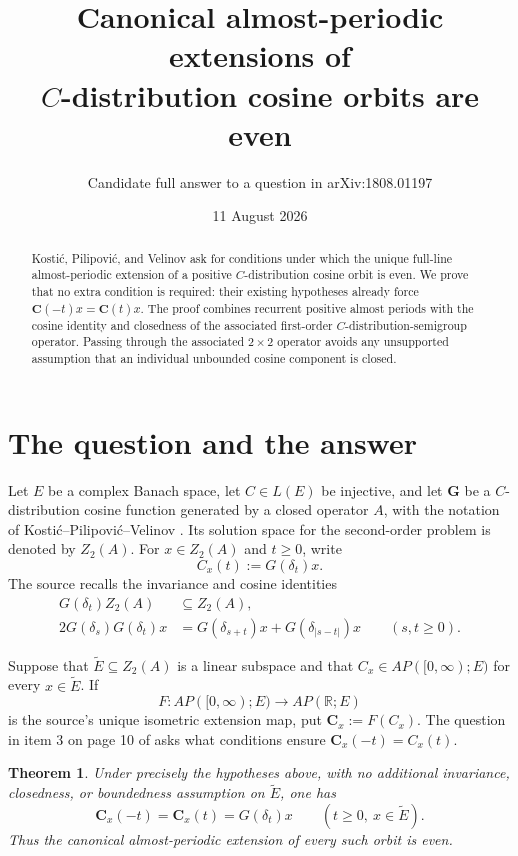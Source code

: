 \documentclass[11pt]{article}
\title{Canonical almost-periodic extensions of\\
$C$-distribution cosine orbits are even}
\author{Candidate full answer to a question in arXiv:1808.01197}
\date{11 August 2026}
\newcommand{\R}{\mathbb R}
\newcommand{\Eap}{\widetilde E}
\newcommand{\Gop}{G}
\newcommand{\Cb}{\mathbf C}
\newtheorem{theorem}{Theorem}
\begin{document}
\maketitle

\begin{abstract}
Kosti\'c, Pilipovi\'c, and Velinov ask for conditions under which the unique
full-line almost-periodic extension of a positive $C$-distribution cosine
orbit is even.  We prove that no extra condition is required: their existing
hypotheses already force $\Cb(-t)x=\Cb(t)x$.  The proof combines recurrent
positive almost periods with the cosine identity and closedness of the
associated first-order $C$-distribution-semigroup operator.  Passing through
the associated $2\times2$ operator avoids any unsupported assumption that an
individual unbounded cosine component is closed.
\end{abstract}

\section{The question and the answer}

Let $E$ be a complex Banach space, let $C\in L(E)$ be injective, and let
$\mathbf G$ be a $C$-distribution cosine function generated by a closed
operator $A$, with the notation of Kosti\'c--Pilipovi\'c--Velinov
\cite{KPV}.  Its solution space for the second-order problem is denoted by
$Z_2(A)$.  For $x\in Z_2(A)$ and $t\geq0$, write
\[
  C_x(t):=\Gop(\delta_t)x.
\]
The source recalls the invariance and cosine identities
\begin{align}
 \Gop(\delta_t)Z_2(A)&\subseteq Z_2(A), \label{eq:invariance}\\
 2\Gop(\delta_s)\Gop(\delta_t)x
   &=\Gop(\delta_{s+t})x+\Gop(\delta_{|s-t|})x
       \qquad(s,t\geq0). \label{eq:cosine}
\end{align}

Suppose that $\Eap\subseteq Z_2(A)$ is a linear subspace and that
$C_x\in AP([0,\infty);E)$ for every $x\in\Eap$.  If
\[
 F:AP([0,\infty);E)\longrightarrow AP(\R;E)
\]
is the source's unique isometric extension map, put
$\Cb_x:=F(C_x)$.  The question in item 3 on page 10 of \cite{KPV} asks what
conditions ensure $\Cb_x(-t)=C_x(t)$.

\begin{theorem}\label{thm:main}
Under precisely the hypotheses above, with no additional invariance,
closedness, or boundedness assumption on $\Eap$, one has
\[
  \Cb_x(-t)=\Cb_x(t)=\Gop(\delta_t)x
  \qquad(t\geq0,\ x\in\Eap).
\]
Thus the canonical almost-periodic extension of every such orbit is even.
\end{theorem}
\end{document}
